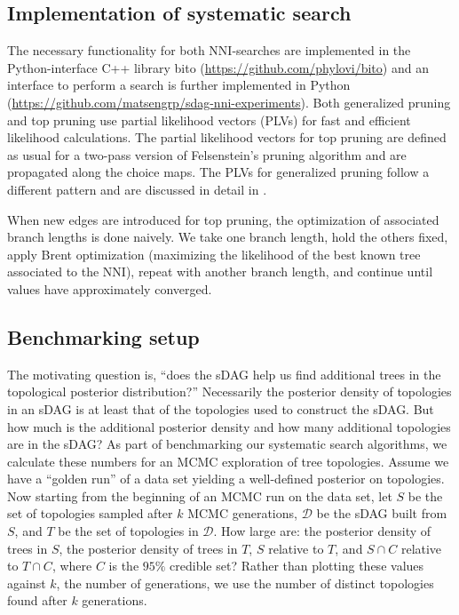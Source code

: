 \documentclass{article}
\begin{document}
\subsection{Implementation of systematic search}

The necessary functionality for both NNI-searches are implemented in the Python-interface C++ library bito (\url{https://github.com/phylovi/bito}) and an interface to perform a search is further implemented in Python (\url{https://github.com/matsengrp/sdag-nni-experiments}).
Both generalized pruning and top pruning use partial likelihood vectors (PLVs) for fast and efficient likelihood calculations.
The partial likelihood vectors for top pruning are defined as usual for a two-pass version of Felsenstein's pruning algorithm and are propagated along the choice maps. 
The PLVs for generalized pruning follow a different pattern and are discussed in detail in \cite{GP}.

When new edges are introduced for top pruning, the optimization of associated branch lengths is done naively. 
We take one branch length, hold the others fixed, apply Brent optimization (maximizing the likelihood of the best known tree associated to the NNI), repeat with another branch length, and continue until values have approximately converged.


\subsection{Benchmarking setup}

The motivating question is, ``does the sDAG help us find additional trees in the topological posterior distribution?''
Necessarily the posterior density of topologies in an sDAG is at least that of the topologies used to construct the sDAG. 
But how much is the additional posterior density and how many additional topologies are in the sDAG? 
As part of benchmarking our systematic search algorithms, we calculate these numbers for an MCMC exploration of tree topologies.
Assume we have a ``golden run'' of a data set yielding a well-defined posterior on topologies.
Now starting from the beginning of an MCMC run on the data set, let $S$ be the set of topologies sampled after $k$ MCMC generations, $\mathcal{D}$ be the sDAG built from $S$, and $T$ be the set of topologies in $\mathcal{D}$.
How large are: the posterior density of trees in $S$, the posterior density of trees in $T$, $S$ relative to $T$, and $S \cap C$ relative to $T \cap C$, where $C$ is the $95\%$ credible set?
Rather than plotting these values against $k$, the number of generations, we use the number of distinct topologies found after $k$ generations.
\end{document}
